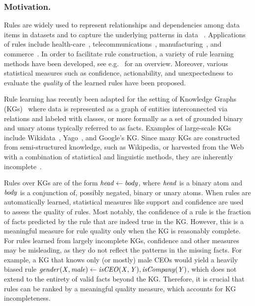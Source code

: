 \documentclass{llncs}
\begin{document}
\subsubsection*{Motivation.}
Rules are widely used to 
represent relationships and dependencies among %
 data items in datasets
and to capture the underlying patterns in data%
~\cite{Agrawal:1993:MAR:170036.170072,DBLP:books/mit/PF91/Piatetsky91}.
Applications of rules 
include health-care~\cite{DBLP:series/isrl/Wojtusiak14}, telecommunications~\cite{DBLP:conf/kdd/MannilaTV95}, 
manufacturing~\cite{DBLP:journals/ki/AuriolMG96,DBLP:conf/semweb/MehdiKSXKBHRR17a,DBLP:conf/semweb/MehdiKSXKBHRR17,DBLP:conf/cikm/MehdiKSXKBHRR17,DBLP:conf/cikm/KharlamovSXPMRH17}, and
commerce~\cite{DBLP:conf/pkdd/RasW00,DBLP:journals/kais/ImRW10}.
%
In order to facilitate rule construction, a variety of
rule learning methods have been developed,
see e.g.~\cite{association-rule-mining-overview} for an overview.
Moreover, various statistical measures such as confidence,
actionability, and unexpectedness to evaluate the \emph{quality} of %
the learned rules have been proposed. 

Rule learning has recently been adapted %
for the setting of
Knowledge Graphs (KGs)~\cite{amie,DBLP:journals/corr/WangL15i}
where data is represented as a graph of entities interconnected via relations and labeled with classes, or more formally as a set of grounded binary and unary atoms typically referred to as facts.
Examples of large-scale KGs include 
Wikidata~\cite{wikidata}, 
Yago~\cite{yago},
 and Google's KG.
Since many KGs are constructed from semi-structured knowledge, such
as Wikipedia, or harvested from the Web with a combination of statistical and linguistic methods, they are inherently incomplete~\cite{DBLP:journals/semweb/Paulheim17,amie}. 

Rules over KGs are of the form $\mathit{head \leftarrow body}$,
where $\mathit{head}$ is a binary atom and 
$\mathit{body}$ is a conjunction of, possibly negated, binary or unary atoms.
When rules are automatically learned, statistical measures like
support and confidence are used to assess the quality of rules.
Most notably, the confidence of a rule is the fraction of
facts predicted by the rule that are indeed true in the KG.
However, this is a meaningful measure for rule quality only
when the KG is reasonably complete.
For rules learned from largely incomplete KGs, confidence and
other measures may be misleading, as they do not reflect
the patterns in the missing facts.
For example, a KG that knows only (or mostly) male CEOs
would yield a heavily biased rule 
$\mathit{gender(X,male) \leftarrow isCEO(X,Y), isCompany(Y)}$, 
which does not
extend to the entirety of valid facts beyond the KG.
Therefore, it is crucial that rules can be ranked by a meaningful
quality measure, %
which accounts for %
KG incompleteness. %
\end{document}
